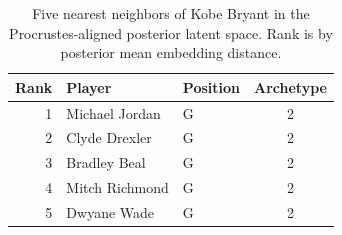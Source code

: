 \begin{table}[htbp]
  \centering\small
  \begin{tabular}{rllc}
    \toprule
    Rank & Player & Position & Archetype \\
    \midrule
    1 & Michael Jordan & G & 2 \\
    2 & Clyde Drexler & G & 2 \\
    3 & Bradley Beal & G & 2 \\
    4 & Mitch Richmond & G & 2 \\
    5 & Dwyane Wade & G & 2 \\
    \bottomrule
  \end{tabular}
  \caption{Five nearest neighbors of Kobe Bryant in the Procrustes-aligned posterior latent space. Rank is by posterior mean embedding distance.}
  \label{tab:Kobe_Bryant_neighbors}
\end{table}

